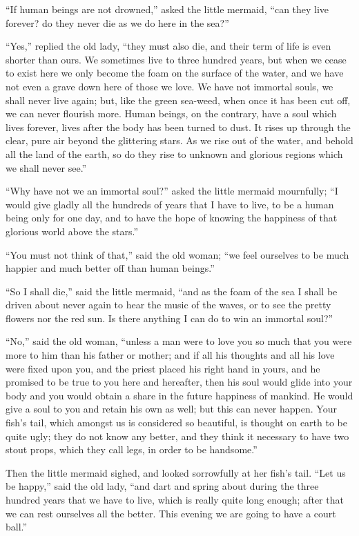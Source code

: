 ``If human beings are not drowned,'' asked the little mermaid, ``can they live forever? do they never die as we do here in the sea?''

``Yes,'' replied the old lady, ``they must also die, and their term of life is even shorter than ours.
We sometimes live to three hundred years, but when we cease to exist here we only become the foam on the surface of the water, and we have not even a grave down here of those we love.
We have not immortal souls, we shall never live again; but, like the green sea-weed, when once it has been cut off, we can never flourish more.
Human beings, on the contrary, have a soul which lives forever, lives after the body has been turned to dust.
It rises up through the clear, pure air beyond the glittering stars.
As we rise out of the water, and behold all the land of the earth, so do they rise to unknown and glorious regions which we shall never see.''

``Why have not we an immortal soul?'' asked the little mermaid mournfully; ``I would give gladly all the hundreds of years that I have to live, to be a human being only for one day, and to have the hope of knowing the happiness of that glorious world above the stars.''

``You must not think of that,'' said the old woman; ``we feel ourselves to be much happier and much better off than human beings.''

``So I shall die,'' said the little mermaid, ``and as the foam of the sea I shall be driven about never again to hear the music of the waves, or to see the pretty flowers nor the red sun.
Is there anything I can do to win an immortal soul?''

``No,'' said the old woman, ``unless a man were to love you so much that you were more to him than his father or mother; and if all his thoughts and all his love were fixed upon you, and the priest placed his right hand in yours, and he promised to be true to you here and hereafter, then his soul would glide into your body and you would obtain a share in the future happiness of mankind.
He would give a soul to you and retain his own as well; but this can never happen.
Your fish’s tail, which amongst us is considered so beautiful, is thought on earth to be quite ugly; they do not know any better, and they think it necessary to have two stout props, which they call legs, in order to be handsome.''

Then the little mermaid sighed, and looked sorrowfully at her fish’s tail.
``Let us be happy,'' said the old lady, ``and dart and spring about during the three hundred years that we have to live, which is really quite long enough; after that we can rest ourselves all the better.
This evening we are going to have a court ball.''

